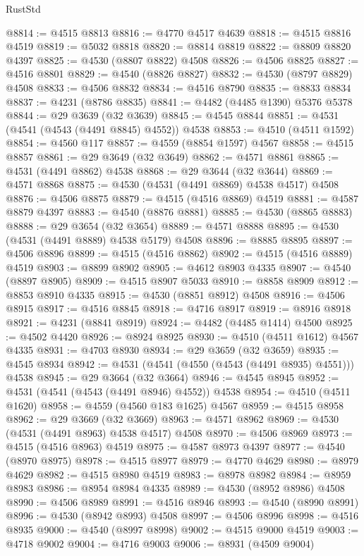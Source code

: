 \begin{lexlean}{RustStd}
\begin{coremodule}
@8814 := @4515 @8813
@8816 := @4770 @4517 @4639
@8818 := @4515 @8816 @4519
@8819 := @5032 @8818
@8820 := @8814 @8819
@8822 := @8809 @8820 @4397
@8825 := @4530 (@8807 @8822) @4508
@8826 := @4506 @8825
@8827 := @4516 @8801
@8829 := @4540 (@8826 @8827)
@8832 := @4530 (@8797 @8829) @4508
@8833 := @4506 @8832
@8834 := @4516 @8790
@8835 := @8833 @8834
@8837 := @4231 (@8786 @8835)
@8841 := @4482 (@4485 @1390) @5376 @5378
@8844 := @29 @3639 (@32 @3639)
@8845 := @4545 @8844
@8851 := @4531 (@4541 (@4543 (@4491 @8845) @4552)) @4538
@8853 := @4510 (@4511 @1592)
@8854 := @4560 @117
@8857 := @4559 (@8854 @1597) @4567
@8858 := @4515 @8857
@8861 := @29 @3649 (@32 @3649)
@8862 := @4571 @8861
@8865 := @4531 (@4491 @8862) @4538
@8868 := @29 @3644 (@32 @3644)
@8869 := @4571 @8868
@8875 := @4530 (@4531 (@4491 @8869) @4538 @4517) @4508
@8876 := @4506 @8875
@8879 := @4515 (@4516 @8869) @4519
@8881 := @4587 @8879 @4397
@8883 := @4540 (@8876 @8881)
@8885 := @4530 (@8865 @8883)
@8888 := @29 @3654 (@32 @3654)
@8889 := @4571 @8888
@8895 := @4530 (@4531 (@4491 @8889) @4538 @5179) @4508
@8896 := @8885 @8895
@8897 := @4506 @8896
@8899 := @4515 (@4516 @8862)
@8902 := @4515 (@4516 @8889) @4519
@8903 := @8899 @8902
@8905 := @4612 @8903 @4335
@8907 := @4540 (@8897 @8905)
@8909 := @4515 @8907 @5033
@8910 := @8858 @8909
@8912 := @8853 @8910 @4335
@8915 := @4530 (@8851 @8912) @4508
@8916 := @4506 @8915
@8917 := @4516 @8845
@8918 := @4716 @8917
@8919 := @8916 @8918
@8921 := @4231 (@8841 @8919)
@8924 := @4482 (@4485 @1414) @4500
@8925 := @4502 @4420
@8926 := @8924 @8925
@8930 := @4510 (@4511 @1612) @4567 @4335
@8931 := @4703 @8930
@8934 := @29 @3659 (@32 @3659)
@8935 := @4545 @8934
@8942 := @4531 (@4541 (@4550 (@4543 (@4491 @8935) @4551))) @4538
@8945 := @29 @3664 (@32 @3664)
@8946 := @4545 @8945
@8952 := @4531 (@4541 (@4543 (@4491 @8946) @4552)) @4538
@8954 := @4510 (@4511 @1620)
@8958 := @4559 (@4560 @183 @1625) @4567
@8959 := @4515 @8958
@8962 := @29 @3669 (@32 @3669)
@8963 := @4571 @8962
@8969 := @4530 (@4531 (@4491 @8963) @4538 @4517) @4508
@8970 := @4506 @8969
@8973 := @4515 (@4516 @8963) @4519
@8975 := @4587 @8973 @4397
@8977 := @4540 (@8970 @8975)
@8978 := @4515 @8977
@8979 := @4770 @4629
@8980 := @8979 @4629
@8982 := @4515 @8980 @4519
@8983 := @8978 @8982
@8984 := @8959 @8983
@8986 := @8954 @8984 @4335
@8989 := @4530 (@8952 @8986) @4508
@8990 := @4506 @8989
@8991 := @4516 @8946
@8993 := @4540 (@8990 @8991)
@8996 := @4530 (@8942 @8993) @4508
@8997 := @4506 @8996
@8998 := @4516 @8935
@9000 := @4540 (@8997 @8998)
@9002 := @4515 @9000 @4519
@9003 := @4718 @9002
@9004 := @4716 @9003
@9006 := @8931 (@4509 @9004)

\end{coremodule}
\end{lexlean}

